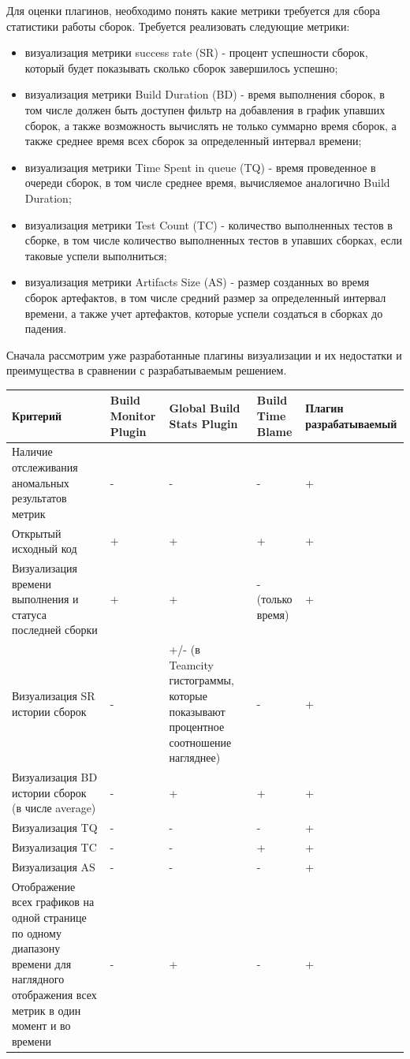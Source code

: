 Для оценки плагинов, необходимо понять какие метрики требуется для сбора статистики работы сборок. Требуется реализовать следующие метрики:

\begin{itemize}
	\item визуализация метрики success rate (SR) - процент успешности сборок, который будет показывать сколько сборок завершилось успешно;
	\item визуализация метрики Build Duration (BD) - время выполнения сборок, в том числе должен быть доступен фильтр на добавления в график упавших сборок, а также возможность вычислять не только суммарно время сборок, а также среднее время всех сборок за определенный интервал времени;
	\item визуализация метрики Time Spent in queue (TQ) - время проведенное в очереди сборок, в том числе среднее время, вычисляемое аналогично Build Duration;
	\item  визуализация метрики Test Count (TC) - количество выполненных тестов в сборке, в том числе количество выполненных тестов в упавших сборках, если таковые успели выполниться;
	\item визуализация метрики Artifacts Size (AS) - размер созданных во время сборок артефактов, в том числе средний размер за определенный интервал времени, а также учет артефактов, которые успели создаться в сборках до падения.
\end{itemize}

Сначала рассмотрим уже разработанные плагины визуализации и их недостатки и преимущества в сравнении с разрабатываемым решением.

\begin{table}
    \centering
    \begin{tabular}{|p{5cm}|p{2cm}|p{3cm}|p{3cm}|p{2cm}|}
    \hline
        Критерий & Build Monitor Plugin & Global Build Stats Plugin  & Build Time Blame & Плагин разрабатываемый  \\ \hline
        Наличие отслеживания аномальных результатов метрик  & - & - & - & +  \\ \hline
        Открытый исходный код  & + &+ & + & +  \\ \hline
        Визуализация времени выполнения и статуса последней сборки & + &+ & - (только время) &+  \\ \hline
        Визуализация SR истории сборок & - & +/- (в Teamcity гистограммы, которые показывают процентное соотношение нагляднее) & - & +  \\ \hline
       Визуализация BD истории сборок (в числе average) & - & + & +  & +  \\ \hline
       Визуализация TQ & - & - & -  &+  \\ \hline
      Визуализация TC & - & - & +  & +  \\ \hline
      Визуализация AS & - &- &-  & +  \\ \hline
       Отображение всех графиков на одной странице по одному диапазону времени для наглядного отображения всех метрик в один момент и во времени & - & + & -  & +  \\ \hline


    \end{tabular}
\end{table}	

